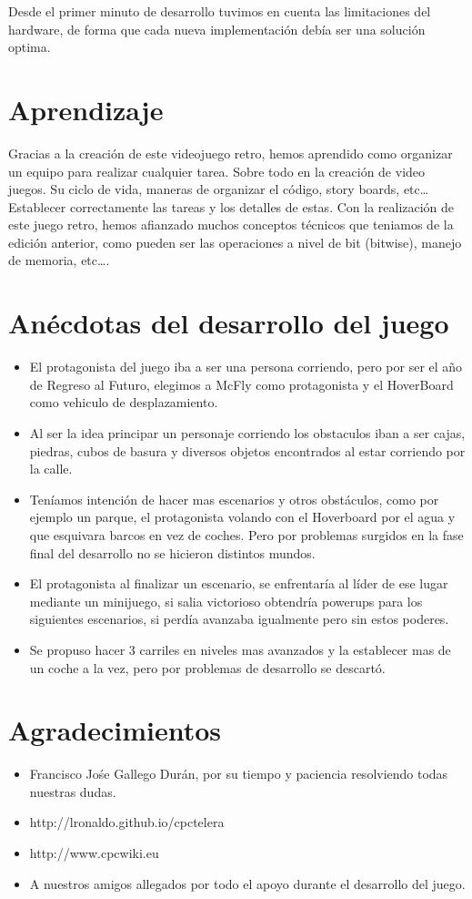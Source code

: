 \documentclass[11pt, spanish]{article}
\begin{document}
Desde el primer minuto de desarrollo tuvimos en cuenta las limitaciones del hardware, de forma que cada nueva implementación debía ser una solución optima.

\section{Aprendizaje}
Gracias a la creación de este videojuego retro, hemos aprendido como organizar un equipo para realizar cualquier tarea. Sobre todo en la creación de video juegos. Su ciclo de vida, maneras de organizar el código, story boards, etc\ldots Establecer correctamente las tareas y los detalles de estas.
Con la realización de este juego retro, hemos afianzado muchos conceptos técnicos que teniamos de la edición anterior, como pueden ser las operaciones a nivel de bit (bitwise), manejo de memoria, etc\ldots.

\section{Anécdotas del desarrollo del juego}
\begin{itemize}
	\item El protagonista del juego iba a ser una persona corriendo, pero por ser el año de Regreso al Futuro, elegimos a McFly como protagonista y el HoverBoard como vehiculo de desplazamiento.
	\item Al ser la idea principar un personaje corriendo los obstaculos iban a ser cajas, piedras, cubos de basura y diversos objetos encontrados al estar corriendo por la calle.
	\item Teníamos intención de hacer mas escenarios y otros obstáculos, como por ejemplo un parque, el protagonista volando con el Hoverboard por el agua y que esquivara barcos en vez de coches. Pero por problemas surgidos en la fase final del desarrollo no se hicieron distintos mundos.
	\item El protagonista al finalizar un escenario, se enfrentaría al líder de ese lugar mediante un minijuego, si salia victorioso obtendría powerups para los siguientes escenarios, si perdía avanzaba igualmente pero sin estos poderes.
	\item Se propuso hacer 3 carriles en niveles mas avanzados y la establecer mas de un coche a la vez, pero por problemas de desarrollo se descartó.
\end{itemize}
\section{Agradecimientos}
\begin{itemize}
	\item Francisco Jośe Gallego Durán, por su tiempo y paciencia resolviendo todas nuestras dudas.
	\item http://lronaldo.github.io/cpctelera
	\item http://www.cpcwiki.eu
	\item A nuestros amigos allegados por todo el apoyo durante el desarrollo del juego.
\end{itemize}
\end{document}
